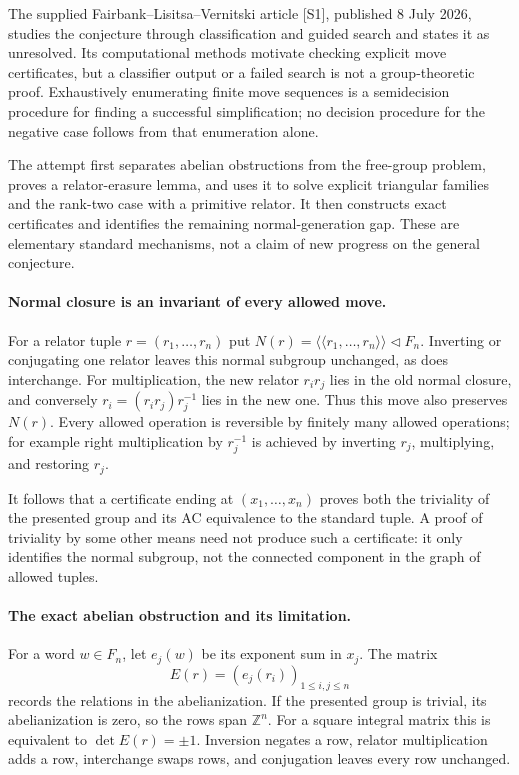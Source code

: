 \documentclass[11pt]{article}
\begin{document}
The supplied Fairbank--Lisitsa--Vernitski article [S1], published
8 July 2026, studies the conjecture through classification and guided
search and states it as unresolved. Its computational methods motivate
checking explicit move certificates, but a classifier output or a failed
search is not a group-theoretic proof. Exhaustively enumerating finite
move sequences is a semidecision procedure for finding a successful
simplification; no decision procedure for the negative case follows
from that enumeration alone.

The attempt first separates abelian obstructions from the free-group
problem, proves a relator-erasure lemma, and uses it to solve explicit
triangular families and the rank-two case with a primitive relator.
It then constructs exact certificates and identifies the remaining
normal-generation gap. These are elementary standard mechanisms, not
a claim of new progress on the general conjecture.

\paragraph{Normal closure is an invariant of every allowed move.}
For a relator tuple $r=(r_1,\ldots,r_n)$ put
$N(r)=\langle\!\langle r_1,\ldots,r_n\rangle\!\rangle\triangleleft F_n$.
Inverting or conjugating one relator leaves this normal subgroup
unchanged, as does interchange. For multiplication, the new relator
$r_ir_j$ lies in the old normal closure, and conversely
$r_i=(r_ir_j)r_j^{-1}$ lies in the new one. Thus this move also preserves
$N(r)$. Every allowed operation is reversible by finitely many allowed
operations; for example right multiplication by $r_j^{-1}$ is achieved
by inverting $r_j$, multiplying, and restoring $r_j$.

It follows that a certificate ending at $(x_1,\ldots,x_n)$ proves both
the triviality of the presented group and its AC equivalence to the
standard tuple. A proof of triviality by some other means need not
produce such a certificate: it only identifies the normal subgroup,
not the connected component in the graph of allowed tuples.

\paragraph{The exact abelian obstruction and its limitation.}
For a word $w\in F_n$, let $e_j(w)$ be its exponent sum in $x_j$.
The matrix
\[
 E(r)=(e_j(r_i))_{1\leq i,j\leq n}
\]
records the relations in the abelianization. If the presented group is
trivial, its abelianization is zero, so the rows span $\mathbb Z^n$.
For a square integral matrix this is equivalent to $\det E(r)=\pm1$.
Inversion negates a row, relator multiplication adds a row, interchange
swaps rows, and conjugation leaves every row unchanged.
\end{document}
